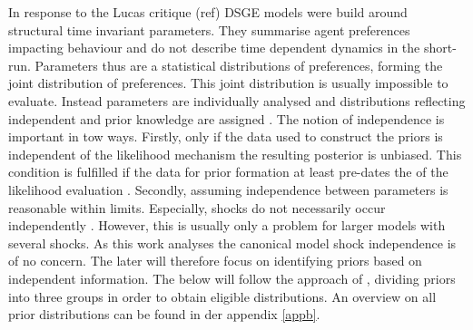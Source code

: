 \documentclass[12pt,a4paper,english]{article} %
\begin{document}
	In response to the Lucas critique (ref) DSGE models were build around structural time invariant parameters. They summarise agent preferences impacting behaviour and do not describe time dependent dynamics in the short-run. 
	Parameters thus are a statistical distributions of preferences, forming the joint distribution of preferences. This joint distribution is usually impossible to evaluate. Instead parameters are individually analysed and distributions reflecting independent and prior knowledge are assigned \cite{del_negro_forming_2008}.	
	The notion of independence is important in tow ways. Firstly, only if the data used to construct the priors is independent of the likelihood mechanism the resulting posterior is unbiased. This condition is fulfilled if the data for prior formation at least pre-dates the of the likelihood evaluation \cite{herbst_bayesian_2016}. Secondly, assuming independence between parameters is reasonable within limits. Especially, shocks do not necessarily occur independently \cite{herbst_bayesian_2016}. However, this is usually only a problem for larger models with several shocks. As this work analyses the canonical model shock independence is of no concern. The later will therefore focus on identifying priors based on independent information. 	
	The below will follow the approach of \cite{del_negro_forming_2008}, dividing priors into three groups in order to obtain eligible distributions. An overview on all prior distributions can be found in der appendix \ref{appb}.
	
\end{document}
